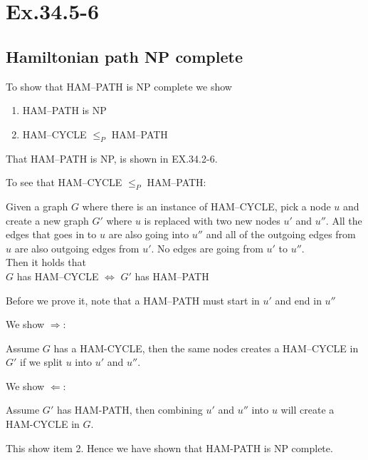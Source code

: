 \section*{Ex.34.5-6}
\subsection*{Hamiltonian path NP complete}

To show that HAM--PATH is NP complete we show
\begin{enumerate}[]
	\item HAM--PATH is NP
	\item HAM--CYCLE $\leq_P$ HAM--PATH
\end{enumerate}
That HAM--PATH is NP, is shown in EX.34.2-6.

To see that HAM--CYCLE $\leq_P$ HAM--PATH:

Given a graph $G$ where there is an instance of HAM--CYCLE, pick a node $u$ and create a new graph $G'$ where $u$ is replaced with two new nodes $u'$ and $u''$. All the edges that goes in to $u$ are also going into $u''$ and all of the outgoing edges from $u$ are also outgoing edges from $u'$. No edges are going from $u'$ to $u''$.
\\
Then it holds that
\\
$G$ has HAM--CYCLE $\Leftrightarrow$ $G'$ has HAM--PATH

Before we prove it, note that a HAM--PATH must start in $u'$ and end in $u''$

We show $\Rightarrow$:

Assume $G$ has a HAM-CYCLE, then the same nodes creates a HAM--CYCLE in $G'$ if we split $u$ into $u'$ and $u''$.

We show $\Leftarrow$:

Assume $G'$ has HAM-PATH, then combining $u'$ and $u''$ into $u$ will create a HAM-CYCLE in $G$.


This show item 2. Hence we have shown that HAM-PATH is NP complete.
